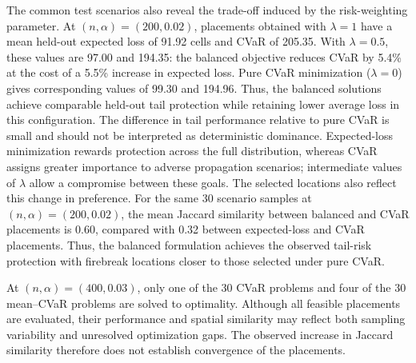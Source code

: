 \documentclass[a4paper,fleqn]{cas-sc}
\begin{document}
The common test scenarios also reveal the trade-off induced by the
risk-weighting parameter. At $(n,\alpha)=(200,0.02)$, placements
obtained with $\lambda=1$ have a mean held-out expected loss of
91.92 cells and CVaR of 205.35. With $\lambda=0.5$, these values are
97.00 and 194.35: the balanced objective reduces CVaR by 5.4\% at
the cost of a 5.5\% increase in expected loss. Pure CVaR minimization
($\lambda=0$) gives corresponding values of 99.30 and 194.96.
Thus, the balanced solutions achieve comparable held-out tail
protection while retaining lower average loss in this configuration.
The difference in tail performance relative to pure CVaR is small and
should not be interpreted as deterministic dominance. Expected-loss
minimization rewards protection across the full distribution, whereas
CVaR assigns greater importance to adverse propagation scenarios;
intermediate values of $\lambda$ allow a compromise between these
goals. The selected locations also reflect this change in preference.
For the same 30 scenario samples at $(n,\alpha)=(200,0.02)$, the
mean Jaccard similarity between balanced and CVaR placements is 0.60,
compared with 0.32 between expected-loss and CVaR placements. Thus,
the balanced formulation achieves the observed tail-risk protection
with firebreak locations closer to those selected under pure CVaR.

At $(n,\alpha)=(400,0.03)$, only one of the 30 CVaR problems and
four of the 30 mean--CVaR problems are solved to optimality. Although
all feasible placements are evaluated, their performance and spatial
similarity may reflect both sampling variability and unresolved
optimization gaps. The observed increase in Jaccard similarity
therefore does not establish convergence of the placements.


\end{document}
